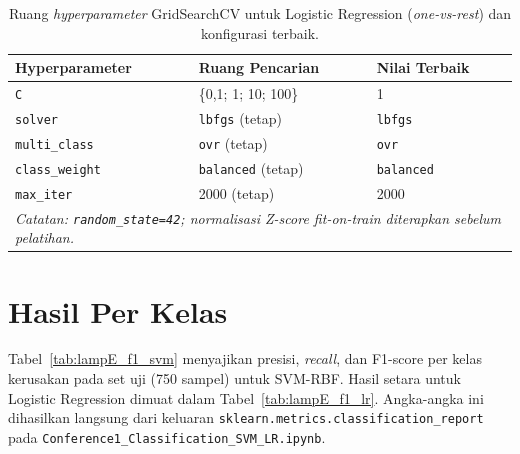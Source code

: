 \begin{table}[ht]
  \centering
  \caption{Ruang \emph{hyperparameter} GridSearchCV untuk Logistic Regression
           (\emph{one-vs-rest}) dan konfigurasi terbaik.}
  \label{tab:lampE_grid_lr}
  \footnotesize
  \begin{tabularx}{\textwidth}{@{}l X X@{}}
    \toprule
    \textbf{Hyperparameter} & \textbf{Ruang Pencarian} & \textbf{Nilai Terbaik} \\
    \midrule
    \texttt{C}              & \{0,1; 1; 10; 100\}   & 1 \\
    \texttt{solver}         & \texttt{lbfgs} (tetap)    & \texttt{lbfgs} \\
    \texttt{multi\_class}   & \texttt{ovr} (tetap)      & \texttt{ovr} \\
    \texttt{class\_weight}  & \texttt{balanced} (tetap) & \texttt{balanced} \\
    \texttt{max\_iter}      & 2000 (tetap)              & 2000 \\
    \midrule
    \multicolumn{3}{l}{\textit{Catatan: \texttt{random\_state=42};
      normalisasi Z-score \emph{fit-on-train} diterapkan sebelum pelatihan.}} \\
    \bottomrule
  \end{tabularx}
\end{table}

\section{Hasil Per Kelas}
\label{lamp:svmlr_perclass}

Tabel~\ref{tab:lampE_f1_svm} menyajikan presisi, \emph{recall}, dan
F1-score per kelas kerusakan pada set uji (750 sampel) untuk SVM-RBF.
Hasil setara untuk Logistic Regression dimuat dalam
Tabel~\ref{tab:lampE_f1_lr}. Angka-angka ini dihasilkan langsung dari
keluaran \texttt{sklearn.metrics.classification\_report} pada
\texttt{Conference1\_Classification\_SVM\_LR.ipynb}.

